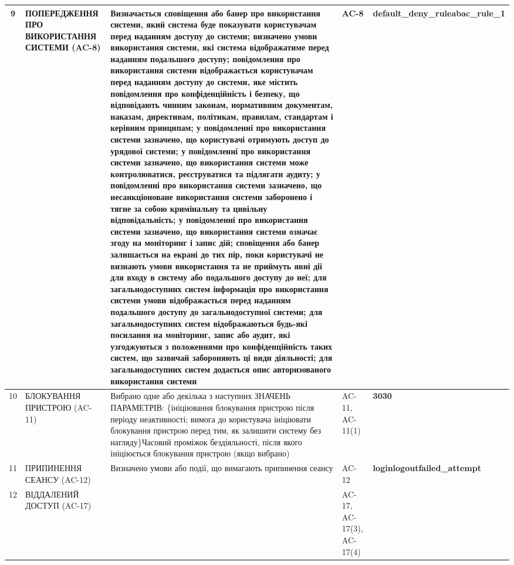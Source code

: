 \documentclass[10pt]{article}
\begin{document}
\begin{longtable}{|c|>{\raggedright\arraybackslash}p{2.5cm}|>{\raggedright\arraybackslash}p{4cm}|>{\raggedright\arraybackslash}p{3.5cm}|>{\raggedright\arraybackslash}p{5.5cm}|}
9 & ПОПЕРЕДЖЕННЯ ПРО ВИКОРИСТАННЯ СИСТЕМИ (AC-8) & Визначається сповіщення або банер про використання системи, який система буде показувати користувачам перед наданням доступу до системи; визначено умови використання системи, які система відображатиме перед наданням подальшого доступу; повідомлення про використання системи відображається користувачам перед наданням доступу до системи, яке містить повідомлення про конфіденційність і безпеку, що відповідають чинним законам, нормативним документам, наказам, директивам, політикам, правилам, стандартам і керівним принципам; у повідомленні про використання системи зазначено, що користувачі отримують доступ до урядової системи; у повідомленні про використання системи зазначено, що використання системи може контролюватися, реєструватися та підлягати аудиту; у повідомленні про використання системи зазначено, що несанкціоноване використання системи заборонено і тягне за собою кримінальну та цивільну відповідальність; у повідомленні про використання системи зазначено, що використання системи означає згоду на моніторинг і запис дій; сповіщення або банер залишається на екрані до тих пір, поки користувачі не визнають умови використання та не приймуть явні дії для входу в систему або подальшого доступу до неї; для загальнодоступних систем інформація про використання системи умови відображається перед наданням подальшого доступу до загальнодоступної системи; для загальнодоступних систем відображаються будь-які посилання на моніторинг, запис або аудит, які узгоджуються з положеннями про конфіденційність таких систем, що зазвичай забороняють ці види діяльності; для загальнодоступних систем додається опис авторизованого використання системи & AC-8 & \textbf{default\_\allowbreak{}deny\_\allowbreak{}ruleabac\_\allowbreak{}rule\_\allowbreak{}1} \\ \hline
10 & БЛОКУВАННЯ ПРИСТРОЮ (AC-11) & Вибрано одне або декілька з наступних ЗНАЧЕНЬ ПАРАМЕТРІВ: \{ініціювання блокування пристрою після періоду неактивності; вимога до користувача ініціювати блокування пристрою перед тим, як залишити систему без нагляду\}\newline Часовий проміжок бездіяльності, після якого ініціюється блокування пристрою (якщо вибрано) & AC-11, AC-11(1) & \textbf{30}\newline \textbf{30} \\ \hline
11 & ПРИПИНЕННЯ СЕАНСУ (AC-12) & Визначено умови або події, що вимагають припинення сеансу & AC-12 & \textbf{loginlogoutfailed\_\allowbreak{}attempt} \\ \hline
12 & ВІДДАЛЕНИЙ ДОСТУП (AC-17) &  & AC-17, AC-17(3), AC-17(4) &  \\ \hline

\end{longtable}
\end{document}
